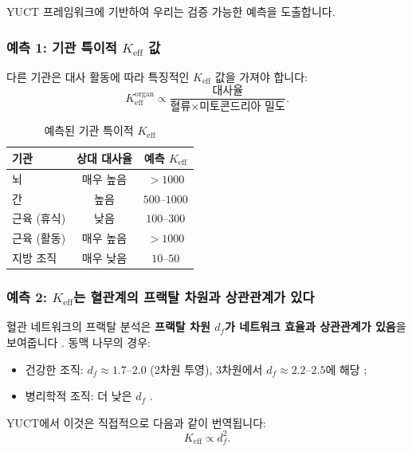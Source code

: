 \documentclass[11pt,a4paper]{article}
\newcommand{\Keff}{K_{\mathrm{eff}}}
\begin{document}
	YUCT 프레임워크에 기반하여 우리는 검증 가능한 예측을 도출합니다.
	
	\subsubsection{예측 1: 기관 특이적 \(\Keff\) 값}
	
	다른 기관은 대사 활동에 따라 특징적인 \(\Keff\) 값을 가져야 합니다:
	\begin{equation}
		\Keff^{\text{organ}} \propto \frac{\text{대사율}}{\text{혈류} \times \text{미토콘드리아 밀도}}.
	\end{equation}
	
	\begin{table}[htbp]
		\centering
		\caption{예측된 기관 특이적 \(K_{\mathrm{eff}}\)}
		\label{tab:organ-keff}
		\begin{tabular}{lcc}
			\toprule
			\textbf{기관} & \textbf{상대 대사율} & \textbf{예측 \(K_{\mathrm{eff}}\)} \\
			\midrule
			뇌 & 매우 높음 & \(>1000\) \\
			간 & 높음 & \(500\)–\(1000\) \\
			근육 (휴식) & 낮음 & \(100\)–\(300\) \\
			근육 (활동) & 매우 높음 & \(>1000\) \\
			지방 조직 & 매우 낮음 & \(10\)–\(50\) \\
			\bottomrule
		\end{tabular}
	\end{table}
	
	\subsubsection{예측 2: \(\Keff\)는 혈관계의 프랙탈 차원과 상관관계가 있다}
	
	혈관 네트워크의 프랙탈 분석은 \textbf{프랙탈 차원 \(d_f\)가 네트워크 효율과 상관관계가 있음}을 보여줍니다 \cite{Gould1993}. 동맥 나무의 경우:
	\begin{itemize}
		\item 건강한 조직: \(d_f \approx 1.7\)–\(2.0\) (2차원 투영), 3차원에서 \(d_f \approx 2.2\)–\(2.5\)에 해당 \cite{Cross1993};
		\item 병리학적 조직: 더 낮은 \(d_f\) \cite{Gould1993}.
	\end{itemize}
	YUCT에서 이것은 직접적으로 다음과 같이 번역됩니다:
	\begin{equation}
		\Keff \propto d_f^{2}.
	\end{equation}
	
\end{document}
